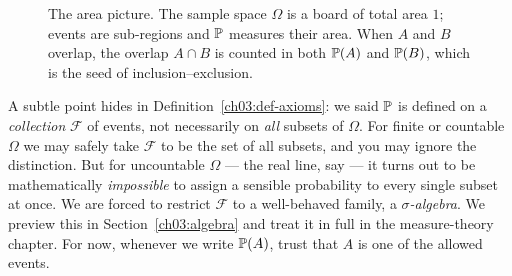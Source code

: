 \begin{figure}[H]
\centering
{}
\caption{The area picture. The sample space $\Omega$ is a board of total area
$1$; events are sub-regions and $\P$ measures their area. When $A$ and $B$
overlap, the overlap $A\cap B$ is counted in both $\P(A)$ and $\P(B)$, which is
the seed of inclusion--exclusion.}
\label{ch03:fig-area}
\end{figure}

\begin{formalbox}
A subtle point hides in Definition~\ref{ch03:def-axioms}: we said $\P$ is defined
on a \emph{collection} $\mathcal{F}$ of events, not necessarily on \emph{all}
subsets of $\Omega$. For finite or countable $\Omega$ we may safely take
$\mathcal{F}$ to be the set of all subsets, and you may ignore the distinction.
But for uncountable $\Omega$ --- the real line, say --- it turns out to be
mathematically \emph{impossible} to assign a sensible probability to every single
subset at once. We are forced to restrict $\mathcal{F}$ to a well-behaved family,
a \emph{$\sigma$-algebra}. We preview this in Section~\ref{ch03:algebra} and treat
it in full in the measure-theory chapter. For now, whenever we write $\P(A)$,
trust that $A$ is one of the allowed events.
\end{formalbox}

